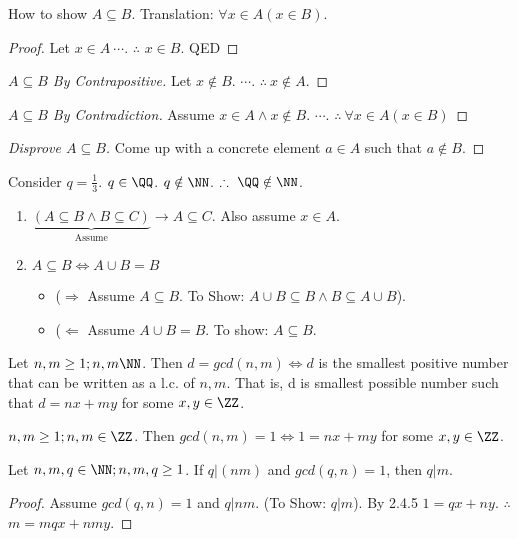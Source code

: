 How to show $A \subseteq B$. Translation: $ \forall x \in A (x \in B)$.
\begin{proof}
Let $x \in A\ \cdots$. $\therefore$ $x \in B$. QED
\end{proof}

\begin{proof}[$A\subseteq B$ By Contrapositive]
Let $x \notin B$. $\cdots$. $\therefore\ x\notin A$.
\end{proof}

\begin{proof}[$A\subseteq B$ By Contradiction]
Assume $x\in A \wedge x \notin B$. $\cdots$. $\therefore\ \forall x\in A(x\in B)$
\end{proof}

\begin{proof}[Disprove $A \subseteq B$]
Come up with a concrete element $a\in A$ such that $a\notin B$.
\end{proof}

\begin{example}[Disprove: $\QQ \in \NN$]
Consider $q = \frac{1}{3}$. $q\in \QQ$. $q \notin \NN$. $\therefore\ \QQ \notin \NN$.
\end{example}


\begin{enumerate}
\item $\underbrace{(A \subseteq B \wedge B \subseteq C)}_{\text{Assume}} \to A \subseteq C$. Also assume $x \in A$.

\item $A \subseteq B \iff A \cup B = B$
\begin{itemize}
\item ($\Rightarrow$ Assume $A \subseteq B$. To Show: $A\cup B \subseteq B \wedge B\subseteq A \cup B$).
\item ($\Leftarrow$ Assume $A\cup B = B$. To show: $A \subseteq B$.
\end{itemize}
\end{enumerate}

\begin{theorem}[Textbook 2.4.3]
Let $n,m \ge 1; n,m \NN$. Then $d=gcd(n,m) \iff d$ is the smallest positive number that can be written as a l.c. of $n,m$. That is, d is smallest possible number such that $d=nx+my$ for some $x,y\in \ZZ$.
\end{theorem}
\begin{theorem}[Corollary 2.4.5]
$n,m \ge 1; n,m \in \ZZ$. Then $gcd(n,m)=1 \iff 1 = nx+my$ for some $x,y\in \ZZ$.
\end{theorem}
\begin{theorem}[Corollary 2.4.6]
Let $n,m,q \in \NN; n,m,q \ge 1$. If $q|(nm)$ and $gcd(q,n)=1$, then $q|m$.
\end{theorem}
\begin{proof}
Assume $gcd(q,n)=1$ and $q|nm$. (To Show: $q|m$). By 2.4.5 $1=qx+ny$. $\therefore$ $m=mqx+nmy$.
\end{proof}


